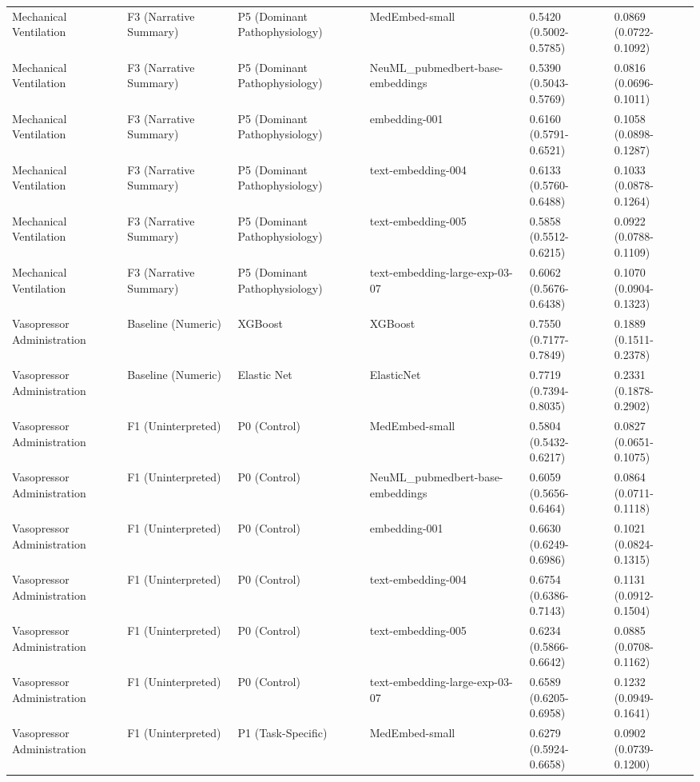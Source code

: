 \documentclass[border=0pt]{standalone}
\begin{document}
\begin{adjustbox}{width=\textwidth}
\begin{tabular}{llllll}
Mechanical Ventilation & F3 (Narrative Summary) & P5 (Dominant Pathophysiology) & MedEmbed-small & 0.5420 (0.5002-0.5785) & 0.0869 (0.0722-0.1092) \\
Mechanical Ventilation & F3 (Narrative Summary) & P5 (Dominant Pathophysiology) & NeuML\_pubmedbert-base-embeddings & 0.5390 (0.5043-0.5769) & 0.0816 (0.0696-0.1011) \\
Mechanical Ventilation & F3 (Narrative Summary) & P5 (Dominant Pathophysiology) & embedding-001 & 0.6160 (0.5791-0.6521) & 0.1058 (0.0898-0.1287) \\
Mechanical Ventilation & F3 (Narrative Summary) & P5 (Dominant Pathophysiology) & text-embedding-004 & 0.6133 (0.5760-0.6488) & 0.1033 (0.0878-0.1264) \\
Mechanical Ventilation & F3 (Narrative Summary) & P5 (Dominant Pathophysiology) & text-embedding-005 & 0.5858 (0.5512-0.6215) & 0.0922 (0.0788-0.1109) \\
Mechanical Ventilation & F3 (Narrative Summary) & P5 (Dominant Pathophysiology) & text-embedding-large-exp-03-07 & 0.6062 (0.5676-0.6438) & 0.1070 (0.0904-0.1323) \\
Vasopressor Administration & Baseline (Numeric) & XGBoost & XGBoost & 0.7550 (0.7177-0.7849) & 0.1889 (0.1511-0.2378) \\
Vasopressor Administration & Baseline (Numeric) & Elastic Net & ElasticNet & 0.7719 (0.7394-0.8035) & 0.2331 (0.1878-0.2902) \\
Vasopressor Administration & F1 (Uninterpreted) & P0 (Control) & MedEmbed-small & 0.5804 (0.5432-0.6217) & 0.0827 (0.0651-0.1075) \\
Vasopressor Administration & F1 (Uninterpreted) & P0 (Control) & NeuML\_pubmedbert-base-embeddings & 0.6059 (0.5656-0.6464) & 0.0864 (0.0711-0.1118) \\
Vasopressor Administration & F1 (Uninterpreted) & P0 (Control) & embedding-001 & 0.6630 (0.6249-0.6986) & 0.1021 (0.0824-0.1315) \\
Vasopressor Administration & F1 (Uninterpreted) & P0 (Control) & text-embedding-004 & 0.6754 (0.6386-0.7143) & 0.1131 (0.0912-0.1504) \\
Vasopressor Administration & F1 (Uninterpreted) & P0 (Control) & text-embedding-005 & 0.6234 (0.5866-0.6642) & 0.0885 (0.0708-0.1162) \\
Vasopressor Administration & F1 (Uninterpreted) & P0 (Control) & text-embedding-large-exp-03-07 & 0.6589 (0.6205-0.6958) & 0.1232 (0.0949-0.1641) \\
Vasopressor Administration & F1 (Uninterpreted) & P1 (Task-Specific) & MedEmbed-small & 0.6279 (0.5924-0.6658) & 0.0902 (0.0739-0.1200) \\

\end{tabular}
\end{adjustbox}
\end{document}
